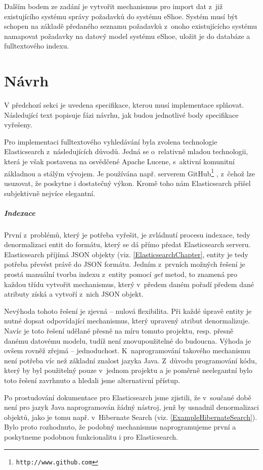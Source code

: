 \documentclass[11pt,oneside]{fithesis2}
\begin{document}
Dalším bodem ze zadání je vytvořit mechanismus pro import dat z~již existujícího systému správy požadavků do systému eShoe. Systém musí být schopen na základě předaného seznamu požadavků z~onoho existujícícho systému namapovat požadavky na datový model systému eShoe, uložit je do databáze a fulltextového indexu.

\section{Návrh}
V předchozí sekci je uvedena specifikace, kterou musí implementace splňovat. Následující text popisuje fázi návrhu, jak budou jednotlivé body specifikace vyřešeny. 

Pro implementaci fulltextového vyhledávání byla zvolena technologie Elasticsearch z~následujících důvodů. Jedná se o~relativně mladou technologii, která je však postavena na osvědčené Apache Lucene, s~aktivní komunitní základnou a stálým vývojem. Je používána např. serverem GitHub\footnote{\texttt{http://www.github.com}} \cite{ElasticsearchDefinitiveGuide}, z~čehož lze usuzovat, že poskytne i dostatečný výkon. Kromě toho nám Elasticsearch přišel subjektivně nejvíce elegantní.

\subparagraph{Indexace}
\label{NavrhIndexace}
První z~problémů, který je potřeba vyřešit, je zvládnutí procesu indexace, tedy denormalizaci entit do formátu, který se dá přímo předat Elasticsearch serveru. Elasticsearch příjímá JSON objekty (viz. \ref{ElasticsearchChapter}, entity je tedy potřeba převést právě do JSON formátu. Jedním z~prvních možných řešení je prostá manuální tvorba indexu z~entity pomocí \emph{get} metod, to znamená pro každou třídu vytvořit mechanismus, který v~předem daném pořadí předem dané atributy získá a vytvoří z~nich JSON objekt.

Nevýhoda tohoto řešení je zjevná -- nulová flexibilita. Při každé úpravě entity je nutné dopsat odpovídající mechanismus, který upravený atribut denormalizuje. Navíc je toto řešení udělané přesně na míru tomuto projektu, resp. přesně danému datovému modelu, tudíž není znovupoužitelné do budoucna. Výhoda je ovšem rovněž zřejmá -- jednoduchost. K~naprogramování takového mechanismu není potřeba víc než základní znalost jazyka Java. Z~důvodu programování kódu, který by byl použitelný pouze v~jednom projektu a je poměrně neelegantní bylo toto řešení zavrhnuto a hledali jsme alternativní přístup.

Po prostudování dokumentace pro Elasticsearch jsme zjistili, že v~součané době není pro jazyk Java naprogramován žádný nástroj, jenž by usnadnil denormalizaci objektů, jako je tomu např. v~Hibernate Search (viz. \ref{ExampleHibernateSearch}). Bylo proto rozhodnuto, že podobný mechanismus naprogramujeme první a poskytneme podobnou funkcionalitu i pro Elasticsearch.
\end{document}
